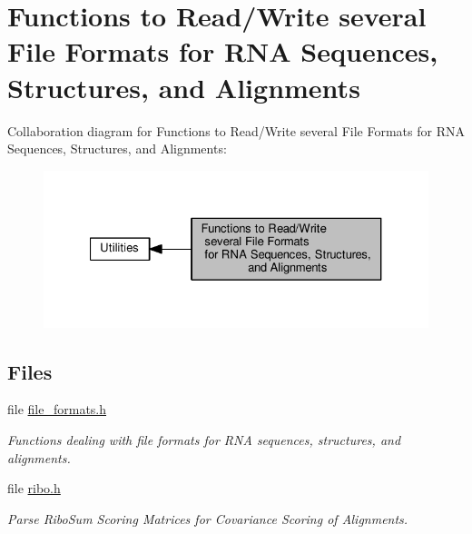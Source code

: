 \hypertarget{group__file__utils}{}\section{Functions to Read/\+Write several File Formats for R\+N\+A Sequences, Structures, and Alignments}
\label{group__file__utils}
Collaboration diagram for Functions to Read/\+Write several File Formats for R\+N\+A Sequences, Structures, and Alignments\+:
\nopagebreak
\begin{figure}[H]
\begin{center}
\leavevmode
\includegraphics[width=327pt]{group__file__utils}
\end{center}
\end{figure}
\subsection*{Files}
\begin{DoxyCompactItemize}
\item 
file \hyperlink{file__formats_8h}{file\+\_\+formats.\+h}
\begin{DoxyCompactList}\small\item\em Functions dealing with file formats for R\+N\+A sequences, structures, and alignments. \end{DoxyCompactList}\item 
file \hyperlink{ribo_8h}{ribo.\+h}
\begin{DoxyCompactList}\small\item\em Parse Ribo\+Sum Scoring Matrices for Covariance Scoring of Alignments. \end{DoxyCompactList}\end{DoxyCompactItemize}
